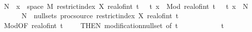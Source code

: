 \begin{isabellebody}
\ \ \ \ \ \ \isamarkupfalse%
\ {\isacharminus}{\kern0pt}\isanewline
\ \ \ \ \ \ \ \ \isamarkupfalse%
\ N\ \ {\isachardoublequoteopen}{\isacharbraceleft}{\kern0pt}x\ {\isasymin}\ space\ {\isacharquery}{\kern0pt}M{\isachardot}{\kern0pt}\ {\isacharparenleft}{\kern0pt}restrict{\isacharunderscore}{\kern0pt}index\ X\ {\isacharbraceleft}{\kern0pt}{}{\isachardot}{\kern0pt}{\isachardot}{\kern0pt}real{\isacharunderscore}{\kern0pt}of{\isacharunderscore}{\kern0pt}int\ {\isasymlfloor}t{\isasymrfloor}\ {\isacharplus}{\kern0pt}\ {}{\isacharbraceright}{\kern0pt}{\isacharparenright}{\kern0pt}\ t\ x\ {\isasymnoteq}\ {\isacharparenleft}{\kern0pt}Mod\ {\isacharparenleft}{\kern0pt}real{\isacharunderscore}{\kern0pt}of{\isacharunderscore}{\kern0pt}int\ {\isasymlfloor}t{\isasymrfloor}\ {\isacharplus}{\kern0pt}\ {}{\isacharparenright}{\kern0pt}{\isacharparenright}{\kern0pt}\ t\ x{\isacharbraceright}{\kern0pt}\ {\isasymsubseteq}\ N\ {\isasymand}\isanewline
\ \ \ \ \ \ N\ {\isasymin}\ null{\isacharunderscore}{\kern0pt}sets\ {\isacharparenleft}{\kern0pt}proc{\isacharunderscore}{\kern0pt}source\ {\isacharparenleft}{\kern0pt}restrict{\isacharunderscore}{\kern0pt}index\ X\ {\isacharbraceleft}{\kern0pt}{}{\isachardot}{\kern0pt}{\isachardot}{\kern0pt}{\isacharparenleft}{\kern0pt}real{\isacharunderscore}{\kern0pt}of{\isacharunderscore}{\kern0pt}int\ {\isasymlfloor}t{\isasymrfloor}\ {\isacharplus}{\kern0pt}\ {}{\isacharparenright}{\kern0pt}{\isacharbraceright}{\kern0pt}{\isacharparenright}{\kern0pt}{\isacharparenright}{\kern0pt}{\isachardoublequoteclose}\isanewline
\ \ \ \ \ \ \ \ \ \ \isamarkupfalse%
\ Mod{\isacharparenleft}{\kern0pt}{}{\isacharparenright}{\kern0pt}{\isacharbrackleft}{\kern0pt}OF\ {\isacartoucheopen}real{\isacharunderscore}{\kern0pt}of{\isacharunderscore}{\kern0pt}int\ {\isasymlfloor}t{\isasymrfloor}\ {\isacharplus}{\kern0pt}\ {}\ {\isachargreater}{\kern0pt}\ {}{\isacartoucheclose}{\isacharcomma}{\kern0pt}\ THEN\ modification{\isacharunderscore}{\kern0pt}null{\isacharunderscore}{\kern0pt}set{\isacharcomma}{\kern0pt}\ of\ t{\isacharbrackright}{\kern0pt}\isanewline
\ \ \ \ \ \ \ \ \ \ \isamarkupfalse%
\ {\isacartoucheopen}t\ {\isasymin}\ {\isacharbraceleft}{\kern0pt}{}{\isachardot}{\kern0pt}{\isachardot}{\kern0pt}{\isacharbraceright}{\kern0pt}{\isacartoucheclose}\ \isamarkupfalse%
\isanewline
\ \ \ \ \ \ \ \ \isamarkupfalse%
\ \isamarkupfalse%

\end{isabellebody}

